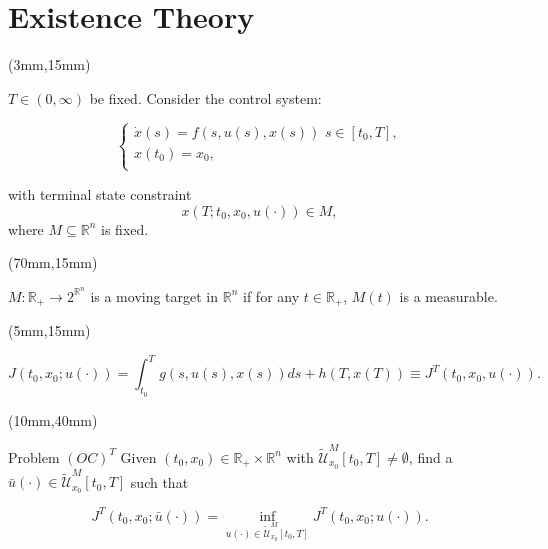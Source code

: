 \documentclass[10pt]{beamer}
\begin{document}
%
%
\section{Existence Theory}

\begin{frame}

\begin{textblock*}{65mm}(3mm,15mm)
	\begin{greenbox}{}
		$T\in (0,\infty)$ be fixed. Consider the control system:

		$$\left\{ \begin{array}{l}
		\dot{x}(s)=f(s,u(s),x(s))\,\,s\in [t_0,T], \\
		x(t_0)=x_0,\\
		\end{array}
		\right.$$

		with terminal state constraint
		$$x(T;t_0,x_0,u(\cdot))\in M,$$
		where $M\subseteq \mathbb{R}^n$ is fixed.
	\end{greenbox}
\end{textblock*}

\begin{textblock*}{55mm}(70mm,15mm)
	\begin{yellowbox}{}
		$M:\mathbb{R}_{+}\rightarrow 2^{\mathbb{R}^n}$ is a moving target in $\mathbb{R}^n$ if for any $t\in \mathbb{R}_{+}$, $M(t)$ is a measurable.
	\end{yellowbox}
\end{textblock*}

\end{frame}


\begin{frame}
	\begin{textblock*}{120mm}(5mm,15mm)
		\begin{yellowbox}{}
			$$J(t_0,x_0;u(\cdot))=\int_{t_0}^{T}g(s,u(s),x(s))ds+h(T,x(T))\equiv J^T(t_0,x_0,u(\cdot)).$$
		\end{yellowbox}
	\end{textblock*}
	\begin{textblock*}{110mm}(10mm,40mm)
		\begin{graybox}{Problem $(OC)^T$}
			Given $(t_0,x_0)\in \mathbb{R}_{+}\times \mathbb{R}^n$ with $\tilde{\mathcal{U}}^M_{x_0}[t_0,T]\neq\emptyset$, find a $\bar{u}(\cdot)\in \tilde{\mathcal{U}}^M_{x_0}[t_0,T]$ such that
			
			\begin{equation*}
			J^T(t_0,x_0;\bar{u}(\cdot))=\inf_{u(\cdot)\in \tilde{\mathcal{U}}^M_{x_0}[t_0,T]} J^T(t_0,x_0;u(\cdot)).
			\end{equation*}
		
		\end{graybox}
	\end{textblock*}
\end{frame}
\end{document}
